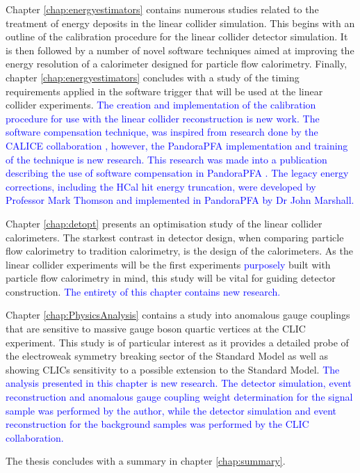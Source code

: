 Chapter \ref{chap:energyestimators} contains numerous studies related to the treatment of energy deposits in the linear collider simulation.  This begins with an outline of the calibration procedure for the linear collider detector simulation.  It is then followed by a number of novel software techniques aimed at improving the energy resolution of a calorimeter designed for particle flow calorimetry.  Finally, chapter \ref{chap:energyestimators} concludes with a study of the timing requirements applied in the software trigger that will be used at the linear collider experiments.  \textcolor{blue}{The creation and implementation of the calibration procedure for use with the linear collider reconstruction is new work.  The software compensation technique, was inspired from research done by the CALICE collaboration \cite{Adloff:2012gv}, however, the PandoraPFA implementation and training of the technique is new research.  This research was made into a publication describing the use of software compensation in PandoraPFA \cite{Tran:2017tgr}.  The legacy energy corrections, including the HCal hit energy truncation, were developed by Professor Mark Thomson and implemented in PandoraPFA by Dr John Marshall.}  

Chapter \ref{chap:detopt} presents an optimisation study of the linear collider calorimeters.  The starkest contrast in detector design, when comparing particle flow calorimetry to tradition calorimetry, is the design of the calorimeters.  As the linear collider experiments will be the first experiments \textcolor{blue}{purposely} built with particle flow calorimetry in mind, this study will be vital for guiding detector construction.  \textcolor{blue}{The entirety of this chapter contains new research.}

Chapter \ref{chap:PhysicsAnalysis} contains a study into anomalous gauge couplings that are sensitive to massive gauge boson quartic vertices at the CLIC experiment.  This study is of particular interest as it provides a detailed probe of the electroweak symmetry breaking sector of the Standard Model as well as showing CLICs sensitivity to a possible extension to the Standard Model.  \textcolor{blue}{The analysis presented in this chapter is new research.  The detector simulation, event reconstruction and anomalous gauge coupling weight determination for the signal sample was performed by the author, while the detector simulation and event reconstruction for the background samples was performed by the CLIC collaboration.}
  
The thesis concludes with a summary in chapter \ref{chap:summary}.

